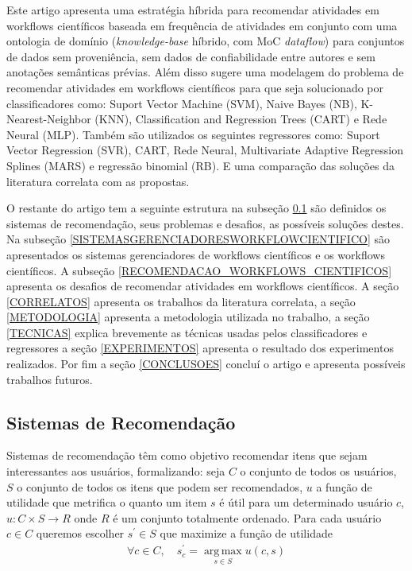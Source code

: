 \documentclass{acm_proc_article-sp}
\begin{document}
Este artigo \cite{Uschold95} apresenta uma estrat{\'e}gia h{\'i}brida para recomendar atividades em workflows cient{\'i}ficos baseada em frequ{\^e}ncia de atividades em conjunto com uma ontologia de dom{\'i}nio (\emph{knowledge-base} h{\'i}brido, com MoC \emph{dataflow}) para conjuntos de dados sem proveni{\^e}ncia, sem dados de confiabilidade entre autores e sem anota\c{c}{\~o}es sem{\^a}nticas pr{\'e}vias. Al{\'e}m disso  sugere uma modelagem do problema de recomendar atividades em workflows cient{\'i}ficos para que seja solucionado por classificadores como: Suport Vector Machine (SVM), Naive Bayes (NB), K-Nearest-Neighbor (KNN), Classification and Regression Trees (CART) e Rede Neural (MLP). Tamb{\'e}m s{\~a}o utilizados os seguintes regressores como: Suport Vector Regression (SVR), CART, Rede Neural, Multivariate Adaptive Regression Splines (MARS) e regress{\~a}o binomial (RB). E uma compara\c{c}{\~a}o das solu\c{c}{\~o}es da literatura correlata com as propostas.

O restante do artigo tem a seguinte estrutura na subse\c{c}{\~a}o \ref{SISTEMASRECOMENDACAO} s{\~a}o definidos os sistemas de recomenda\c{c}{\~a}o, seus problemas e desafios, as poss{\'i}veis solu\c{c}{\~o}es destes. Na subse\c{c}{\~a}o \ref{SISTEMASGERENCIADORESWORKFLOWCIENTIFICO} s{\~a}o apresentados os sistemas gerenciadores de workflows cient{\'i}ficos e os workflows cient{\'i}ficos. A subse\c{c}{\~a}o \ref{RECOMENDACAO_WORKFLOWS_CIENTIFICOS} apresenta os desafios de recomendar atividades em workflows cient{\'i}ficos. A se\c{c}{\~a}o \ref{CORRELATOS} apresenta os trabalhos da literatura correlata, a se\c{c}{\~a}o \ref{METODOLOGIA} apresenta a metodologia utilizada no trabalho, a se\c{c}{\~a}o 
\ref{TECNICAS} explica brevemente as t{\'e}cnicas usadas pelos classificadores e regressores a se\c{c}{\~a}o \ref{EXPERIMENTOS} apresenta o resultado dos experimentos realizados. Por fim a se\c{c}{\~a}o \ref{CONCLUSOES} conclu{\'i} o artigo e apresenta poss{\'i}veis trabalhos futuros.


\subsection{Sistemas de Recomenda\c{c}{\~a}o}\label{SISTEMASRECOMENDACAO}
Sistemas de recomenda\c{c}{\~a}o t{\^e}m como objetivo recomendar itens que sejam interessantes aos usu{\'a}rios, formalizando: seja \(C\) o conjunto de todos os usu{\'a}rios, \(S\) o conjunto de todos os itens que podem ser recomendados, \(u\) a fun\c{c}{\~a}o de utilidade que metrifica o quanto um item \(s\) {\'e} {\'u}til para um determinado usu{\'a}rio \(c\), \(u:C \times S\rightarrow R\) onde \(R\) {\'e} um conjunto totalmente ordenado. Para cada usu{\'a}rio \(c \in C \) queremos escolher \(s^{'} \in S \) que maximize a fun\c{c}{\~a}o de utilidade 
\begin{align}
\forall c \in C,  \quad s_{c}^{'} =  \operatorname*{arg\,max}_{s \in S} u(c,s) \label{formalizar_recomendacao}
\end{align}
\end{document}
